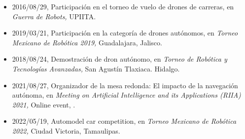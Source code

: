 \begin{itemize} 
\item 2016/08/29, Participación en el torneo de vuelo de drones de carreras, en \textit{ Guerra de Robots,} UPIITA.
\item 2019/03/21, Participación en la categoría de drones autónomos, en \textit{ Torneo Mexicano de Robótica 2019,} Guadalajara, Jalisco.
\item 2018/08/24, Demostración de dron autónomo, en \textit{ Torneo de Robótica y Tecnologías Avanzadas,} San Agustín Tlaxiaca. Hidalgo.
\item 2021/08/27, Organizador de la mesa redonda: El impacto de la navegación autónoma, en \textit{ Meeting on Artificial Intelligence and its Applications (RIIA) 2021,} Online event, \href{https://www.dropbox.com/s/i73p5valw0ei3kb/2021_RIIA.pdf?dl=0}{{\faFilePdfO}}.
\item 2022/05/19, Automodel car competition, en \textit{ Torneo Mexicano de Robótica 2022,} Ciudad Victoria, Tamaulipas.
\end{itemize} 
